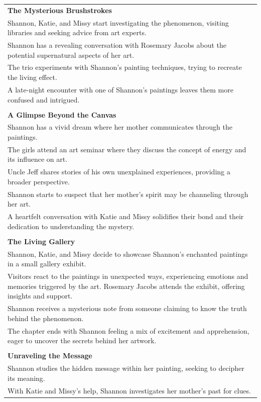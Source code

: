 \begin{small}
\begin{longtable}{p{}}
\\
\textbf{The Mysterious Brushstrokes}\\
Shannon, Katie, and Missy start investigating the phenomenon, visiting libraries and seeking advice from art experts.\\
Shannon has a revealing conversation with Rosemary Jacobs about the potential supernatural aspects of her art.\\
The trio experiments with Shannon's painting techniques, trying to recreate the living effect.\\
A late-night encounter with one of Shannon's paintings leaves them more confused and intrigued.\\
\\
\textbf{A Glimpse Beyond the Canvas}\\
Shannon has a vivid dream where her mother communicates through the paintings.\\
The girls attend an art seminar where they discuss the concept of energy and its influence on art.\\
Uncle Jeff shares stories of his own unexplained experiences, providing a broader perspective.\\
Shannon starts to suspect that her mother's spirit may be channeling through her art.\\
A heartfelt conversation with Katie and Missy solidifies their bond and their dedication to understanding the mystery.\\
\\
\textbf{The Living Gallery}\\
Shannon, Katie, and Missy decide to showcase Shannon's enchanted paintings in a small gallery exhibit.\\
Visitors react to the paintings in unexpected ways, experiencing emotions and memories triggered by the art.
Rosemary Jacobs attends the exhibit, offering insights and support.\\
Shannon receives a mysterious note from someone claiming to know the truth behind the phenomenon.\\
The chapter ends with Shannon feeling a mix of excitement and apprehension, eager to uncover the secrets behind her artwork.\\
\\
\textbf{Unraveling the Message}\\
Shannon studies the hidden message within her painting, seeking to decipher its meaning.\\
With Katie and Missy's help, Shannon investigates her mother's past for clues.

\end{longtable}
\end{small}
